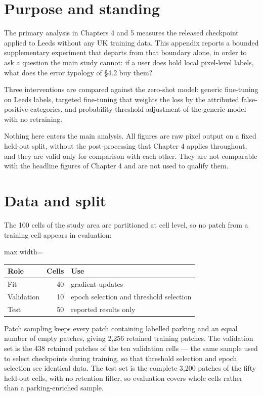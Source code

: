 \hypertarget{purpose-and-standing}{%
\section{Purpose and standing}\label{purpose-and-standing}}

The primary analysis in Chapters 4 and 5 measures the released checkpoint applied to Leeds without any UK training data. This appendix reports a bounded supplementary experiment that departs from that boundary alone, in order to ask a question the main study cannot: if a user does hold local pixel-level labels, what does the error typology of §4.2 buy them?

Three interventions are compared against the zero-shot model: generic fine-tuning on Leeds labels, targeted fine-tuning that weights the loss by the attributed false-positive categories, and probability-threshold adjustment of the generic model with no retraining.

Nothing here enters the main analysis. All figures are raw pixel output on a fixed held-out split, without the post-processing that Chapter 4 applies throughout, and they are valid only for comparison with each other. They are not comparable with the headline figures of Chapter 4 and are not used to qualify them.

\hypertarget{data-and-split}{%
\section{Data and split}\label{data-and-split}}

The 100 cells of the study area are partitioned at cell level, so no patch from a training cell appears in evaluation:

\begin{table}[htbp]
\centering
\begin{adjustbox}{max width=\textwidth}
\begin{tabular}{@{}lrl@{}}
\toprule
Role & Cells & Use \\
\midrule
Fit & 40 & gradient updates \\
Validation & 10 & epoch selection and threshold selection \\
Test & 50 & reported results only \\
\bottomrule
\end{tabular}
\end{adjustbox}
\end{table}
\restoreparskip

Patch sampling keeps every patch containing labelled parking and an equal number of empty patches, giving 2,256 retained training patches. The validation set is the 438 retained patches of the ten validation cells --- the same sample used to select checkpoints during training, so that threshold selection and epoch selection see identical data. The test set is the complete 3,200 patches of the fifty held-out cells, with no retention filter, so evaluation covers whole cells rather than a parking-enriched sample.

